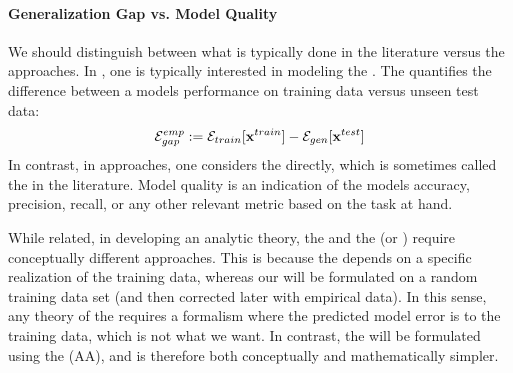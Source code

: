 \paragraph{Generalization Gap vs. Model Quality}
\label{sxn:SMOG_main-model_quality}

We should distinguish between what is typically done in the \SLT literature versus the \STATMECH approaches.
In \SLT, one is typically interested in modeling the \emph{\GeneralizationGap}.
The \GeneralizationGap quantifies the difference between a models performance on training data versus unseen test data:
\begin{align}
  \label{eqn:gen_gap}
  \mathcal{E}^{emp}_{gap}:= {\mathcal{E}}_{train}[\mathbf{x}^{train}]- {\mathcal{E}}_{gen}[\mathbf{x}^{test}]
\end{align}
In contrast, in \STATMECH approaches, one considers the \ModelGeneralizationError directly,
which is sometimes called the \ModelQuality in the \SLT literature.
Model quality is an indication of the models accuracy, precision, recall, or any other relevant metric based on the task at hand.

While related, in developing an analytic theory, the \GeneralizationGap and
the \ModelQuality (or \ModelGeneralizationError) require conceptually different approaches.
This is because the  \GeneralizationGap depends on a specific realization of the training data,
whereas our \ModelGeneralizationError will be formulated on a random training data set
(and then corrected later with empirical data).
In this sense, any theory of the \GeneralizationGap  requires a formalism where the
predicted model error is \Quenched to the training data, which is not what we want.
In contrast, the \ModelGeneralizationError  will be formulated using the \AnnealedApproximation (AA),
and is therefore both conceptually and mathematically simpler.


